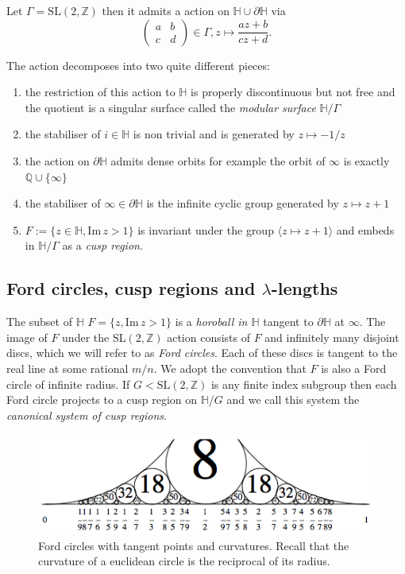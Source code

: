 \documentclass[12pt,a4paper]{amsart}
\def\HH{\mathbb{H}}
\def\dHH{\partial \mathbb{H}}
\def\im{\mathrm{Im}\,}
\def\ZZ{\mathbb{Z}}
\def\sl2{\mathrm{SL}(2, \ZZ)}
\begin{document}
Let $\Gamma = \sl2$ then it admits a action on $\mathbb{H}\cup \dHH$ via
$$
\begin{pmatrix} a&b\\c&d \end{pmatrix} \in \Gamma,
z \mapsto \frac{az + b}{cz + d}.
$$

The action decomposes into two quite different pieces:
\begin{enumerate}
	\item the restriction of this action to $\mathbb{H}$
		is properly discontinuous but not free and the quotient is
		a singular surface called the \textit{modular
		surface} $\mathbb{H}/\Gamma$
	\item	the stabiliser of $i\in \mathbb{H}$ is non
		trivial and is generated by $z\mapsto -1 / z$
	\item the action on $\dHH$ admits dense orbits for
		example the orbit of $\infty$ is exactly
		$\mathbb{Q}\cup \{\infty\}$
	\item the stabiliser of $\infty \in \dHH$ is the
		infinite cyclic group generated by $z\mapsto
		z+1$

	\item $F := \{z\in \mathbb{H}, \mathrm{Im}\,z > 1\}$ is
		invariant under the group $\langle z \mapsto
		z+1 \rangle$  and embeds in
		$\mathbb{H}/\Gamma$ as a \textit{cusp region}.

\end{enumerate}

\subsection{Ford circles, cusp regions and $\lambda$-lengths}

The subset of $\mathbb{H}$  $F= \{ z, \im z > 1\}$
is a \textit{horoball in $\HH$} tangent to $\dHH$ at $\infty$.
The image of $F$ under the $\sl2$ action consists of
$F$ and infinitely many disjoint discs, 
which we will refer to as  \textit{Ford circles}. 
Each of these discs is tangent to the real line at some rational $m/n$.
We adopt the convention that $F$ is also a Ford circle of infinite radius.
If $G < \sl2$ is any finite index subgroup then 
each Ford circle projects to a cusp region on $\mathbb{H}/G$ and we
call this system  the \textit{canonical system of cusp regions}.

\begin{figure}[H]
\begin{center}
\includegraphics[scale=.8]{Ford-circles.png} 
\end{center}
\caption{Ford circles with tangent points and curvatures.
Recall that the curvature of a euclidean circle is the reciprocal of its radius.}
\end{figure}
\end{document}
